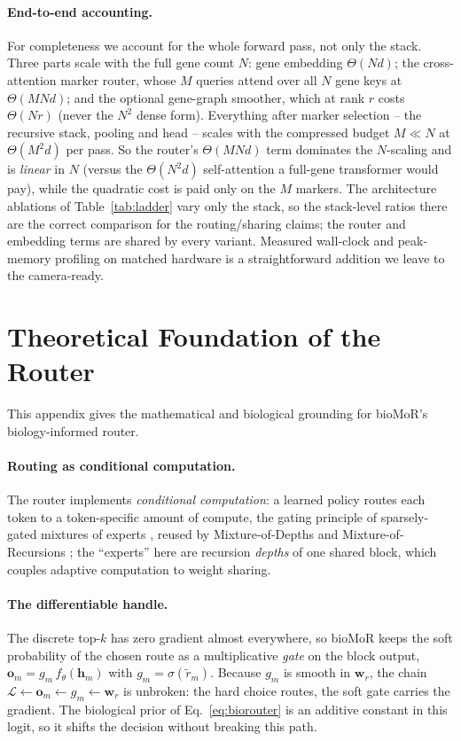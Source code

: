 \documentclass[letterpaper]{article}
\begin{document}
\paragraph{End-to-end accounting.}
For completeness we account for the whole forward pass, not only the stack. Three parts
scale with the full gene count $N$: gene embedding $\Theta(Nd)$; the cross-attention
marker router, whose $M$ queries attend over all $N$ gene keys at
$\Theta(MNd)$; and the optional gene-graph smoother, which at rank $r$ costs
$\Theta(Nr)$ (never the $N^2$ dense form). Everything after marker selection -- the
recursive stack, pooling and head -- scales with the compressed budget $M\ll N$ at
$\Theta(M^2d)$ per pass. So the router's $\Theta(MNd)$ term dominates the $N$-scaling
and is \emph{linear} in $N$ (versus the $\Theta(N^2 d)$ self-attention a full-gene
transformer would pay), while the quadratic cost is paid only on the $M$ markers. The
architecture ablations of Table~\ref{tab:ladder} vary only the stack, so the stack-level
ratios there are the correct comparison for the routing/sharing claims; the router and
embedding terms are shared by every variant. Measured wall-clock and peak-memory
profiling on matched hardware is a straightforward addition we leave to the camera-ready.

\section{Theoretical Foundation of the Router}
\label{app:theory}
This appendix gives the mathematical and biological grounding for bioMoR's
biology-informed router.

\paragraph{Routing as conditional computation.}
The router implements \emph{conditional computation}: a learned policy routes each token
to a token-specific amount of compute, the gating principle of sparsely-gated mixtures
of experts \cite{shazeer2017outrageously}, reused by Mixture-of-Depths
\cite{raposo2024mixture} and Mixture-of-Recursions \cite{bae2025mixture}; the
``experts'' here are recursion \emph{depths} of one shared block, which couples adaptive
computation \cite{graves2016adaptive} to weight sharing.

\paragraph{The differentiable handle.}
The discrete top-$k$ has zero gradient almost everywhere, so bioMoR keeps the soft
probability of the chosen route as a multiplicative \emph{gate} on the block output,
$\mathbf{o}_m=g_m\,f_\theta(\mathbf{h}_m)$ with $g_m=\sigma(\tilde r_m)$. Because $g_m$
is smooth in $\mathbf{w}_r$, the chain
$\mathcal{L}\!\leftarrow\!\mathbf{o}_m\!\leftarrow\!g_m\!\leftarrow\!\mathbf{w}_r$ is
unbroken: the hard choice routes, the soft gate carries the gradient. The biological
prior of Eq.~\eqref{eq:biorouter} is an additive constant in this logit, so it shifts
the decision without breaking this path.
\end{document}

